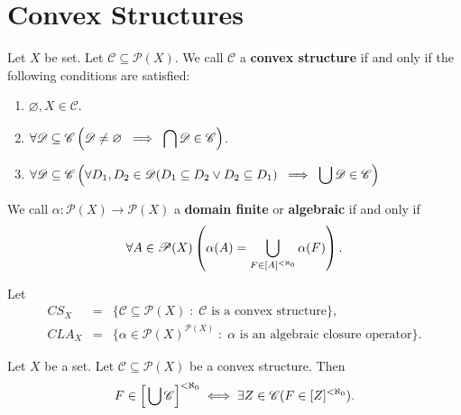 \documentclass{amsart}
\begin{document}
\section{Convex Structures} %
\begin{definition}
Let \(X\) be set.
Let \(\mathscr{C} \subseteq \mathscr{P} (X)\).
We call \(\mathscr{C}\) a \textbf{convex structure} if and only if
the following conditions are satisfied:
\begin{enumerate}
	\item \(\varnothing , X \in \mathscr{C}\).
	\item \(\forall \mathscr{D} \subseteq \mathscr{C}
	\left(\mathscr{D} \ne \varnothing
		 \;\implies\; \displaystyle\bigcap \mathscr{D} \in \mathscr{C} \right)\).
	\item \(\forall \mathscr{D} \subseteq \mathscr{C} \left(
	\forall D_1,D_2 \in \mathscr{D} (D_1 \subseteq D_2 \lor D_2 \subseteq D_1 )
	\;\implies\; \displaystyle\bigcup \mathscr{D} \in \mathscr{C} 
	\right)\)
\end{enumerate}
\end{definition}

\begin{definition}
We call \(\alpha : \mathscr{P} (X) \longrightarrow \mathscr{P} (X)\) a 
\textbf{domain finite} or \textbf{algebraic} if and only if
\[
	\forall A \in \mathscr{P} (X)
	\left(
	\alpha (A) = \displaystyle\bigcup_{F \in [A] ^{< \aleph _0}} \alpha (F)
	\right).
\]
\end{definition}

\begin{definition}
	Let
	\[
		\begin{array}{rcl}
		CS_X & = & 
		\{\mathscr{C} \subseteq \mathscr{P} (X) \;:\; \mathscr{C} 
		\mbox{ is a convex structure} \},
		\\
		CLA_X & = & 
		\{\alpha  \in \mathscr{P} (X) ^ {\mathscr{P} (X)} \;:\; 
			\alpha \mbox{ is an algebraic closure operator}\}.
		\end{array}
	\]
\end{definition}

\begin{lemma}
Let \(X\) be a set.
Let \(\mathscr{C} \subseteq \mathscr{P} (X)\) be a convex structure.
Then
\[
	F \in \Big[\displaystyle\bigcup \mathscr{C}\Big] ^ {< \aleph _0} \iff 
	\exists Z \in \mathscr{C} (F \in [Z]^ {< \aleph _0}).
\]
\end{lemma}
\end{document}
